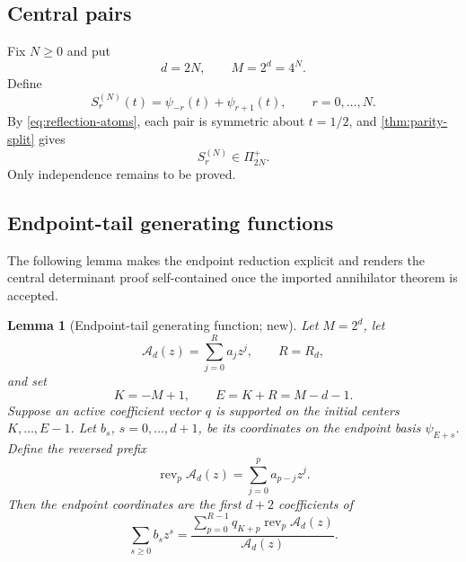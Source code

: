 \documentclass[11pt,oneside]{article}
\numberwithin{equation}{section}
\newtheorem{lemma}[theorem]{Lemma}
\theoremstyle{definition}
\theoremstyle{remark}
\newcommand{\rev}{\operatorname{rev}}
\begin{document}
\subsection{Central pairs}

Fix $N\ge0$ and put
\begin{equation}
 d=2N,\qquad M=2^d=4^N.
 \label{eq:central-scale}
\end{equation}
Define
\begin{equation}
 S_r^{(N)}(t)=\psi_{-r}(t)+\psi_{r+1}(t),
 \qquad r=0,\ldots,N.
 \label{eq:central-pairs}
\end{equation}
By \eqref{eq:reflection-atoms}, each pair is symmetric about $t=1/2$, and
\cref{thm:parity-split} gives
\begin{equation}
 S_r^{(N)}\in\Pi_{2N}^{+}.
 \label{eq:central-polynomial}
\end{equation}
Only independence remains to be proved.

\subsection{Endpoint-tail generating functions}

The following lemma makes the endpoint reduction explicit and renders the
central determinant proof self-contained once the imported annihilator theorem
is accepted.

\begin{lemma}[Endpoint-tail generating function; new]
\label{lem:endpoint-tail}
Let $M=2^d$, let
\[
 \mathcal A_d(z)=\sum_{j=0}^{R}a_jz^j,\qquad R=R_d,
\]
and set
\[
 K=-M+1,\qquad E=K+R=M-d-1.
\]
Suppose an active coefficient vector $q$ is supported on the initial centers
$K,\ldots,E-1$.  Let $b_s$, $s=0,\ldots,d+1$, be its coordinates on the
endpoint basis $\psi_{E+s}$.  Define the reversed prefix
\begin{equation}
 \rev_p\mathcal A_d(z)=\sum_{j=0}^{p}a_{p-j}z^j.
 \label{eq:reversed-prefix}
\end{equation}
Then the endpoint coordinates are the first $d+2$ coefficients of
\begin{equation}
 \boxed{
 \sum_{s\ge0}b_sz^s=
 \frac{\displaystyle\sum_{p=0}^{R-1}q_{K+p}
 \rev_p\mathcal A_d(z)}{\mathcal A_d(z)}.}
 \label{eq:endpoint-tail-gf}
\end{equation}
\end{lemma}
\end{document}
